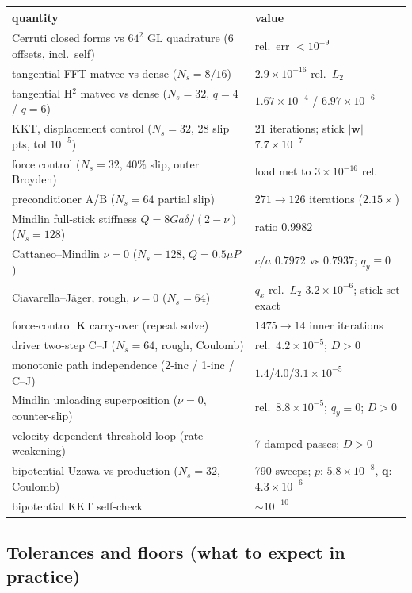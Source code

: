 \documentclass[11pt,a4paper]{article}
\newcommand{\bq}{\mathbf{q}}
\newcommand{\bw}{\mathbf{w}}
\newcommand{\bK}{\mathbf{K}}
\newcommand{\abs}[1]{\lvert#1\rvert}
\begin{document}
\begin{center}
\small
\begin{tabular}{ll}
\toprule
quantity & value \\
\midrule
Cerruti closed forms vs $64^2$ GL quadrature (6 offsets, incl.\ self) & rel.\ err $< 10^{-9}$ \\
tangential FFT matvec vs dense ($N_s=8/16$) & $2.9\times10^{-16}$ rel.\ $L_2$ \\
tangential H$^2$ matvec vs dense ($N_s=32$, $q{=}4$ / $q{=}6$) & $1.67\times10^{-4}$ / $6.97\times10^{-6}$ \\
KKT, displacement control ($N_s=32$, 28 slip pts, tol $10^{-5}$) & 21 iterations; stick $\abs{\bw}$ $7.7\times10^{-7}$ \\
force control ($N_s=32$, $40\%$ slip, outer Broyden) & load met to $3\times10^{-16}$ rel. \\
preconditioner A/B ($N_s=64$ partial slip) & $271 \to 126$ iterations ($2.15\times$) \\
Mindlin full-stick stiffness $Q = 8Ga\delta/(2-\nu)$ ($N_s=128$) & ratio $0.9982$ \\
Cattaneo--Mindlin $\nu=0$ ($N_s=128$, $Q=0.5\mu P$) & $c/a$ $0.7972$ vs $0.7937$; $q_y \equiv 0$ \\
Ciavarella--J\"ager, rough, $\nu=0$ ($N_s=64$) & $q_x$ rel.\ $L_2$ $3.2\times10^{-6}$; stick set exact \\
force-control $\bK$ carry-over (repeat solve) & $1475 \to 14$ inner iterations \\
driver two-step C--J ($N_s=64$, rough, Coulomb) & rel.\ $4.2\times10^{-5}$; $D > 0$ \\
monotonic path independence (2-inc / 1-inc / C--J) & $1.4$/$4.0$/$3.1 \times10^{-5}$ \\
Mindlin unloading superposition ($\nu=0$, counter-slip) & rel.\ $8.8\times10^{-5}$; $q_y \equiv 0$; $D>0$ \\
velocity-dependent threshold loop (rate-weakening) & 7 damped passes; $D > 0$ \\
bipotential Uzawa vs production ($N_s=32$, Coulomb) & 790 sweeps; $p$: $5.8\times10^{-8}$, $\bq$: $4.3\times10^{-6}$ \\
bipotential KKT self-check & $\sim 10^{-10}$ \\
\bottomrule
\end{tabular}
\end{center}

\subsection{Tolerances and floors (what to expect in practice)}
\end{document}
